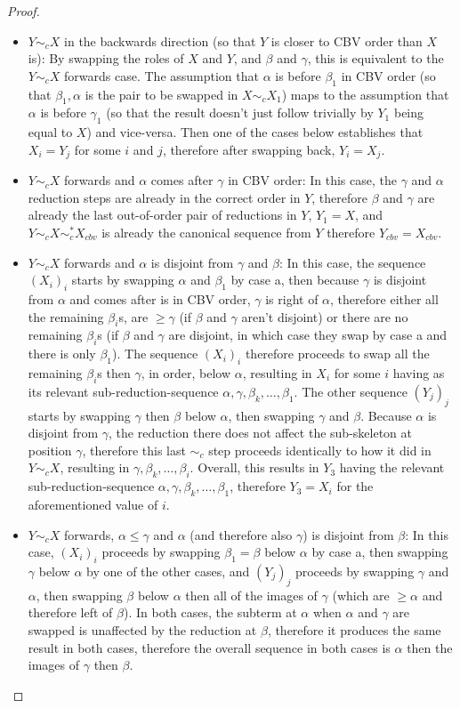 \begin{proof}
\begin{itemize}
  \item $Y \sim_c X$ in the backwards direction (so that $Y$ is closer to CBV order than $X$ is): By swapping the roles of $X$ and $Y$, and $\beta$ and $\gamma$, this is equivalent to the $Y \sim_c X$ forwards case. The assumption that $\alpha$ is before $\beta_1$ in CBV order (so that $\beta_1, \alpha$ is the pair to be swapped in $X \sim_c X_1$) maps to the assumption that $\alpha$ is before $\gamma_1$ (so that the result doesn't just follow trivially by $Y_1$ being equal to $X$) and vice-versa. Then one of the cases below establishes that $X_i = Y_j$ for some $i$ and $j$, therefore after swapping back, $Y_i = X_j$.
\item $Y \sim_c X$ forwards and $\alpha$ comes after $\gamma$ in CBV order: In this case, the $\gamma$ and $\alpha$ reduction steps are already in the correct order in $Y$, therefore $\beta$ and $\gamma$ are already the last out-of-order pair of reductions in $Y$, $Y_1 = X$, and $Y \sim_c X \sim_c^* X_{cbv}$ is already the canonical sequence from $Y$ therefore $Y_{cbv} = X_{cbv}$.
\item $Y \sim_c X$ forwards and $\alpha$ is disjoint from $\gamma$ and $\beta$: In this case, the sequence $(X_i)_i$ starts by swapping $\alpha$ and $\beta_1$ by case a, then because $\gamma$ is disjoint from $\alpha$ and comes after is in CBV order, $\gamma$ is right of $\alpha$, therefore either all the remaining $\beta_i$s, are $\geq \gamma$ (if $\beta$ and $\gamma$ aren't disjoint) or there are no remaining $\beta_i$s (if $\beta$ and $\gamma$ are disjoint, in which case they swap by case a and there is only $\beta_1$). The sequence $(X_i)_i$ therefore proceeds to swap all the remaining $\beta_i$s then $\gamma$, in order, below $\alpha$, resulting in $X_i$ for some $i$ having as its relevant sub-reduction-sequence $\alpha, \gamma, \beta_k, \dots, \beta_1$. The other sequence $(Y_j)_j$ starts by swapping $\gamma$ then $\beta$ below $\alpha$, then swapping $\gamma$ and $\beta$. Because $\alpha$ is disjoint from $\gamma$, the reduction there does not affect the sub-skeleton at position $\gamma$, therefore this last $\sim_c$ step proceeds identically to how it did in $Y \sim_c X$, resulting in $\gamma, \beta_k, \dots, \beta_i$. Overall, this results in $Y_3$ having the relevant sub-reduction-sequence $\alpha, \gamma, \beta_k, \dots, \beta_1$, therefore $Y_3 = X_i$ for the aforementioned value of $i$.
\item $Y \sim_c X$ forwards, $\alpha \leq \gamma$ and $\alpha$ (and therefore also $\gamma$) is disjoint from $\beta$: In this case, $(X_i)_i$ proceeds by swapping $\beta_1 = \beta$ below $\alpha$ by case a, then swapping $\gamma$ below $\alpha$ by one of the other cases, and $(Y_j)_j$ proceeds by swapping $\gamma$ and $\alpha$, then swapping $\beta$ below $\alpha$ then all of the images of $\gamma$ (which are $\geq \alpha$ and therefore left of $\beta$). In both cases, the subterm at $\alpha$ when $\alpha$ and $\gamma$ are swapped is unaffected by the reduction at $\beta$, therefore it produces the same result in both cases, therefore the overall sequence in both cases is $\alpha$ then the images of $\gamma$ then $\beta$.

\end{itemize}
\end{proof}
